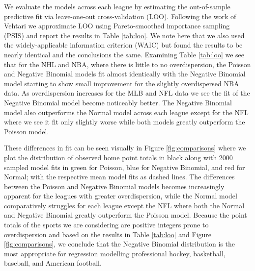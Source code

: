 We evaluate the models across each league by estimating the out-of-sample predictive fit via leave-one-out cross-validation (LOO). Following the work of Vehtari \cite{Vehtari2016} we approximate LOO using Pareto-smoothed importance sampling (PSIS) and report the results in Table \ref{tab:loo}. We note here that we also used the widely-applicable information criterion (WAIC) \cite{Watanabe2010} but found the results to be nearly identical and the conclusions the same. Examining Table \ref{tab:loo} we see that for the NHL and NBA, where there is little to no overdispersion, the Poisson and Negative Binomial models fit almost identically with the Negative Binomial model starting to show small improvement for the slightly overdispersed NBA data. As overdispersion increases for the MLB and NFL data we see the fit of the Negative Binomial model become noticeably better. The Negative Binomial model also outperforms the Normal model across each league except for the NFL where we see it fit only slightly worse while both models greatly outperform the Poisson model.

These differences in fit can be seen visually in Figure \ref{fig:comparisons} where we plot the distribution of observed home point totals in black along with 2000 sampled model fits in green for Poisson, blue for Negative Binomial, and red for Normal; with the respective mean model fits as dashed lines. The differences between the Poisson and Negative Binomial models becomes increasingly apparent for the leagues with greater overdispersion, while the Normal model comparatively struggles for each league except the NFL where both the Normal and Negative Binomial greatly outperform the Poisson model. Because the point totals of the sports we are considering are positive integers prone to overdispersion and based on the results in Table \ref{tab:loo} and Figure \ref{fig:comparisons}, we conclude that the Negative Binomial distribution is the most appropriate for regression modelling professional hockey, basketball, baseball, and American football.

